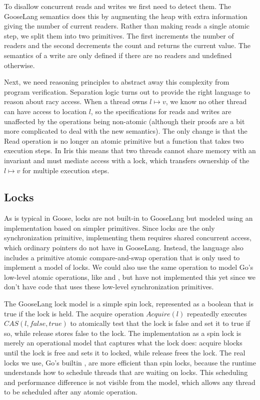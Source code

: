 To disallow concurrent reads and writes we first need to detect them.
The GooseLang semantics does this by augmenting the heap with extra
information giving the number of current readers. Rather than making
reads a single atomic step, we split them into two primitives. The first
increments the number of readers and the second decrements the count and
returns the current value. The semantics of a write are only defined if
there are no readers and undefined otherwise.

Next, we need reasoning principles to abstract away this complexity from
program verification. Separation logic turns out to provide the right
language to reason about racy access. When a thread owns
$l \mapsto v$, we know no other thread can have access to location
$l$, so the specifications for reads and writes are unaffected by the
operations being non-atomic (although their proofs are a bit more
complicated to deal with the new semantics). The only change is that the
Read operation is no longer an atomic primitive but a function that
takes two execution steps. In Iris this means that two threads cannot
share memory with an invariant and must mediate access with a lock,
which transfers ownership of the $l \mapsto v$ for multiple execution
steps.

\subsection{Locks}

As is typical in Goose, locks are not built-in to GooseLang but modeled
using an implementation based on simpler primitives. Since locks are the
only synchronization primitive, implementing them requires shared
concurrent access, which ordinary pointers do not have in GooseLang.
Instead, the language also includes a primitive atomic compare-and-swap
operation that is only used to implement a model of locks. We could also
use the same operation to model Go's low-level atomic operations, like
 and , but
have not implemented this yet since we don't have code that uses these
low-level synchronization primitives.

The GooseLang lock model is a simple spin lock, represented as a boolean
that is true if the lock is held. The acquire operation $Acquire(l)$
repeatedly executes $CAS(l, false, true)$ to atomically test that the
lock is false and set it to true if so, while release stores false to
the lock. The implementation as a spin lock is merely an operational
model that captures what the lock does: acquire blocks until the lock is
free and sets it to locked, while release frees the lock. The real locks
we use, Go's builtin , are more efficient than spin
locks, because the runtime understands how to schedule threads that are
waiting on locks. This scheduling and performance difference is not
visible from the model, which allows any thread to be scheduled after
any atomic operation.

